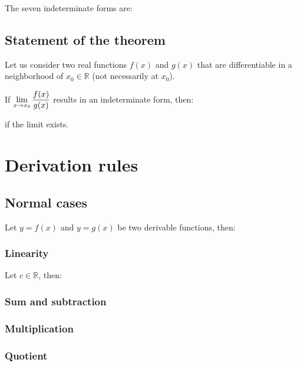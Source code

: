 \documentclass{article}
\begin{document}
The seven indeterminate forms are:

\newpage
\subsection{Statement of the theorem}
Let us consider two real functions $f(x)$ and $g(x)$ that are differentiable
in a neighborhood of $x_0\in\mathbb{R}$ (not necessarily at $x_0$).

If $\displaystyle \lim_{x \to x_0} \frac{f(x)}{g(x)}$ results in an indeterminate form, then:


if the limit exists.

\section{Derivation rules}
\subsection{Normal cases}
Let $y=f(x)$ and $y=g(x)$ be two derivable functions, then:

\subsubsection{Linearity}
Let $c \in \mathbb{R}$, then:

\subsubsection{Sum and subtraction}

\subsubsection{Multiplication}

\subsubsection{Quotient}
\end{document}
